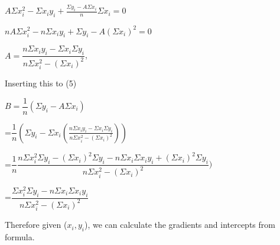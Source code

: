 \documentclass[11pt, oneside]{article}   	%
\begin{document}
\begin{spacing}{1.5}
$A\Sigma{x_i^2} - \Sigma{x_i y_i} + \frac{\Sigma{y_i}-A\Sigma{x_i}}{n}\Sigma{x_i}= 0$\par

$nA\Sigma{x_i^2} - n\Sigma{x_i y_i} + \Sigma{y_i}-A(\Sigma{x_i})^2= 0$\par

$A=\dfrac{n\Sigma{x_i y_i}-\Sigma{x_i}\Sigma{y_i}}{n\Sigma{x_i^2}-(\Sigma{x_i})^2}$,\par
\end{spacing}
Inserting this to (5)\\
\begin{spacing}{1.5}
$B=\dfrac{1}{n}(\Sigma{y_i}-A\Sigma{x_i})$\par=$\dfrac{1}{n}\left(\Sigma{y_i}-\Sigma{x_i}(\frac{n\Sigma{x_i y_i}-\Sigma{x_i}\Sigma{y_i}}{n\Sigma{x_i^2}-(\Sigma{x_i})^2})\right)$
\par=$\dfrac{1}{n}\dfrac{n\Sigma{x_i^2}\Sigma{y_i}-(\Sigma{x_i})^2\Sigma{y_i}-n\Sigma{x_i}\Sigma{x_i y_i}+(\Sigma{x_i})^2\Sigma{y_i}}{n\Sigma{x_i^2}-(\Sigma{x_i})^2})$
\par=$\dfrac{\Sigma{x_i^2}\Sigma{y_i}-n\Sigma{x_i}\Sigma{x_i y_i}}{n\Sigma{x_i^2}-(\Sigma{x_i})^2}$
\end{spacing}

Therefore given ($x_i,y_i$), we can calculate the gradients and intercepts from formula.
\end{document}
